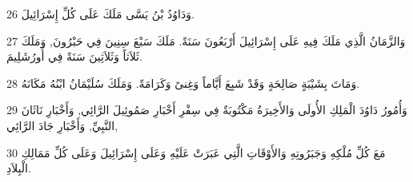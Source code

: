 \par 26 وَدَاوُدُ بْنُ يَسَّى مَلَكَ عَلَى كُلِّ إِسْرَائِيلَ.
\par 27 وَالزَّمَانُ الَّذِي مَلَكَ فِيهِ عَلَى إِسْرَائِيلَ أَرْبَعُونَ سَنَةً. مَلَكَ سَبْعَ سِنِينَ فِي حَبْرُونَ, وَمَلَكَ ثَلاَثاً وَثَلاَثِينَ سَنَةً فِي أُورُشَلِيمَ.
\par 28 وَمَاتَ بِشَيْبَةٍ صَالِحَةٍ وَقَدْ شَبِعَ أَيَّاماً وَغِنىً وَكَرَامَةً. وَمَلَكَ سُلَيْمَانُ ابْنُهُ مَكَانَهُ.
\par 29 وَأُمُورُ دَاوُدَ الْمَلِكِ الأُولَى وَالأَخِيرَةُ مَكْتُوبَةٌ فِي سِفْرِ أَخْبَارِ صَمُوئِيلَ الرَّائِي, وَأَخْبَارِ نَاثَانَ النَّبِيِّ, وَأَخْبَارِ جَادَ الرَّائِي,
\par 30 مَعَ كُلِّ مُلْكِهِ وَجَبَرُوتِهِ وَالأَوْقَاتِ الَّتِي عَبَرَتْ عَلَيْهِ وَعَلَى إِسْرَائِيلَ وَعَلَى كُلِّ مَمَالِكِ الْبِلاَدِ.


